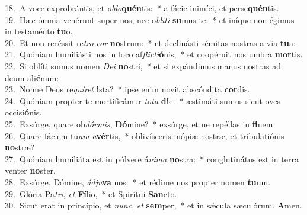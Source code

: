 {18.~}A voce exprobrántis, et \textit{o}\textit{blo}\textbf{quén}tis:~* a fácie inimíci, et perse\textbf{quén}tis.\\
{19.~}Hæc ómnia venérunt super nos, nec o\textit{blí}\textit{ti} \textbf{su}mus te:~* et iníque non égimus in testaménto \textbf{tu}o.\\
{20.~}Et non recéssit re\textit{tro} \textit{cor} \textbf{no}strum:~* et declinásti sémitas nostras a via \textbf{tu}a:\\
{21.~}Quóniam humiliásti nos in loco af\textit{fli}\textit{cti}\textbf{ó}nis,~* et coopéruit nos umbra \textbf{mor}tis.\\
{22.~}Si oblíti sumus nomen \textit{De}\textit{i} \textbf{no}stri,~* et si expándimus manus nostras ad deum ali\textbf{é}num:\\
{23.~}Nonne Deus re\textit{quí}\textit{ret} \textbf{i}sta?~* ipse enim novit abscóndita \textbf{cor}dis.\\
{24.~}Quóniam propter te mortificámur \textit{to}\textit{ta} \textbf{di}e:~* æstimáti sumus sicut oves occisi\textbf{ó}nis.\\
{25.~}Exsúrge, quare ob\textit{dór}\textit{mis}, \textbf{Dó}mine?~* exsúrge, et ne repéllas in \textbf{fi}nem.\\
{26.~}Quare fáciem tu\textit{am} \textit{a}\textbf{vér}tis,~* oblivísceris inópiæ nostræ, et tribulatiónis \textbf{no}stræ?\\
{27.~}Quóniam humiliáta est in púlvere á\textit{ni}\textit{ma} \textbf{no}stra:~* conglutinátus est in terra venter \textbf{no}ster.\\
{28.~}Exsúrge, Dómine, \textit{ád}\textit{ju}\textbf{va} nos:~* et rédime nos propter nomen \textbf{tu}um.\\
{29.~}Glória Pa\textit{tri}, \textit{et} \textbf{Fí}lio,~* et Spirítui \textbf{San}cto.\\
{30.~}Sicut erat in princípio, et \textit{nunc}, \textit{et} \textbf{sem}per,~* et in sǽcula sæculórum. \textbf{A}men.\\
